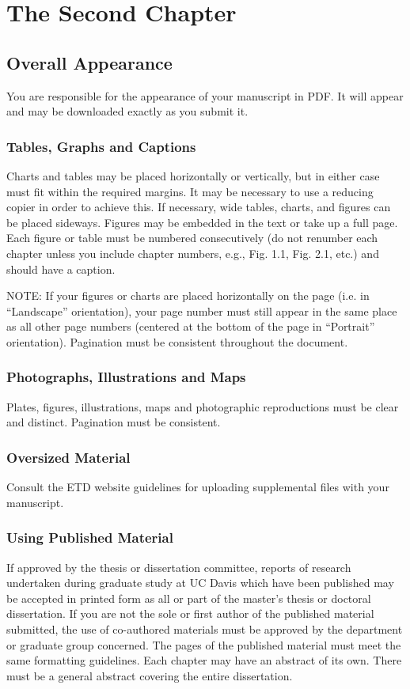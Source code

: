 \chapter{The Second Chapter}

\section{Overall Appearance}
%
You are responsible for the appearance of your manuscript in PDF. It will appear and may be downloaded exactly as you submit it.

\subsection{Tables, Graphs and Captions}
%
Charts and tables may be placed horizontally or vertically, but in either case must fit within the required margins. It may be necessary to use a reducing copier in order to achieve this. If necessary, wide tables, charts, and figures can be placed sideways. Figures may be embedded in the text or take up a full page. Each figure or table must be numbered consecutively (do not renumber each chapter unless you include chapter numbers, e.g., Fig. 1.1, Fig. 2.1, etc.) and should have a caption.

NOTE: If your figures or charts are placed horizontally on the page (i.e. in “Landscape” orientation), your page number must still appear in the same place as all other page numbers (centered at the bottom of the page in “Portrait” orientation). Pagination must be consistent throughout the document.


\subsection{Photographs, Illustrations and Maps}
%
Plates, figures, illustrations, maps and photographic reproductions must be clear and distinct. Pagination must be consistent.

\subsection{Oversized Material}
%
Consult the ETD website guidelines for uploading supplemental files with your manuscript.

\subsection{Using Published Material}
%
If approved by the thesis or dissertation committee, reports of research undertaken during graduate study at UC Davis which have been published may be accepted in printed form as all or part of the master's thesis or doctoral dissertation. If you are not the sole or first author of the published material submitted, the use of co-authored materials must be approved by the department or graduate group concerned.
The pages of the published material must meet the same formatting guidelines. Each chapter may have an abstract of its own. There must be a general abstract covering the entire dissertation.

